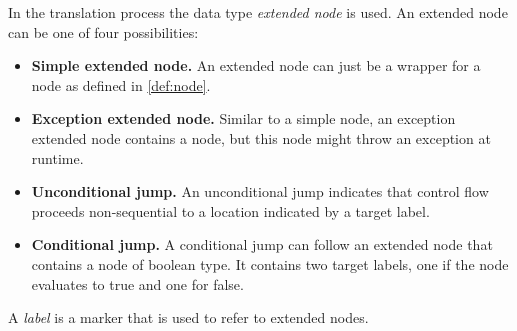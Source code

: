 \begin{definition}
    In the translation process the data type \emph{extended node} is used.
    An extended node can be one of four possibilities:
    \begin{itemize}
        \item \textbf{Simple extended node.} An extended node can just be a wrapper for a node
        as defined in \autoref{def:node}.
        \item \textbf{Exception extended node.} Similar to a simple node, an exception extended
        node contains a node, but this node might throw an exception at runtime.
        \item \textbf{Unconditional jump.} An unconditional jump indicates that control
        flow proceeds non-sequential to a location indicated by a target label.
        \item \textbf{Conditional jump.} A conditional jump can follow an extended node
        that contains a node of boolean type. It contains two target labels, one if the
        node evaluates to true and one for false.
    \end{itemize}
\end{definition}
\begin{definition}[Label]
    A \emph{label} is a marker that is used to refer to extended nodes.
\end{definition}

